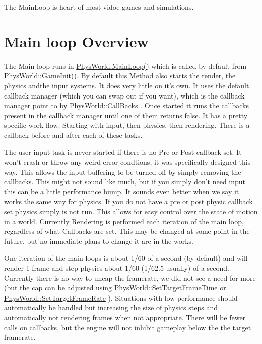 The MainLoop is heart of most vidoe games and simulations.\hypertarget{dd/d99/mainloop1_overview1}{}\section{Main loop Overview}\label{dd/d99/mainloop1_overview1}
The Main loop runs in \hyperlink{classPhysWorld_ad41cad0347b6f5ba7ec05568aaffa514}{PhysWorld.MainLoop()} which is called by default from \hyperlink{classPhysWorld_a92cf86cdb716bdd762b4029e95b1ee8f}{PhysWorld::GameInit()}. By default this Method also starts the render, the physics andthe input systems. It does very little on it's own. It uses the default callback manager (which you can swap out if you want), which is the callback manager point to by \hyperlink{classPhysWorld_a080ea6f1584374b07d3c1f29c7ed64df}{PhysWorld::CallBacks} . Once started it runs the callbacks present in the callback manager until one of them returns false. It has a pretty specific work flow. Starting with input, then physics, then rendering. There is a callback before and after each of these tasks. \par
 \par
 The user input task is never started if there is no Pre or Post callback set. It won't crash or throw any weird error condtions, it was specifically designed this way. This allows the input buffering to be turned off by simply removing the callbacks. This might not sound like much, but if you simply don't need input this can be a little performance bump. It sounds even better when we say it works the same way for physics. If you do not have a pre or post physic callback set physics simply is not run. This allows for easy control over the state of motion in a world. Currently Rendering is performed each iteration of the main loop, regardless of what Callbacks are set. This may be changed at some point in the future, but no immediate plans to change it are in the works. \par
 \par
 One iteration of the main loops is about 1/60 of a second (by default) and will render 1 frame and step physics about 1/60 (1/62.5 usually) of a second. Currently there is no way to uncap the framerate, we did not see a need for more (but the cap can be adjusted using \hyperlink{classPhysWorld_af2954fa97d3e5f12e7c69b84fb493ade}{PhysWorld::SetTargetFrameTime} or \hyperlink{classPhysWorld_a4b02ee63ad6c20be767fd20f2f1128f5}{PhysWorld::SetTargetFrameRate} ). Situations with low performance should automatically be handled but increasing the size of physics steps and automatically not rendering frames when not appropriate. There will be fewer calls on callbacks, but the engine will not inhibit gameplay below the the target framerate. \par
